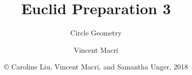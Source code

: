 

\usepackage{tikz}

\title{Euclid Preparation 3}
\subtitle{Circle Geometry}
\author{Vincent Macri}
\date{\copyright{} Caroline Liu, Vincent Macri, and Samantha Unger, 2018}


	\frame{\titlepage}
	

